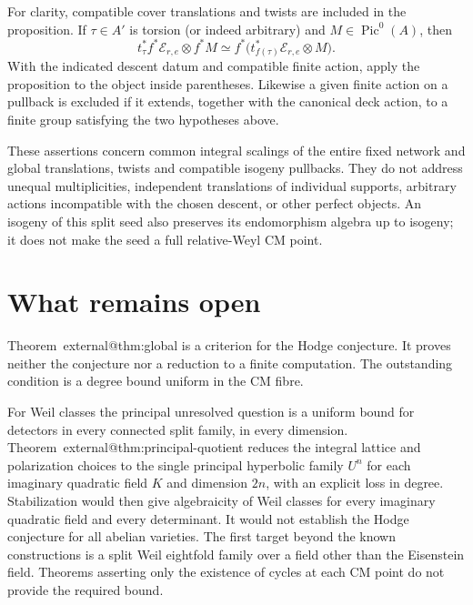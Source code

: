 \documentclass[11pt]{article}
\makeatletter
\providecommand{\compref}[1]{\csname external@#1\endcsname}
\theoremstyle{definition}
\theoremstyle{remark}
\makeatother
\begin{document}
For clarity, compatible cover translations and twists are
included in the proposition.  If $\tau\in A'$ is torsion
(or indeed arbitrary) and $M\in\operatorname{Pic}^0(A)$, then
\[
 t_\tau^*f^*\mathcal E_{r,e}\otimes f^*M
   \simeq f^*\bigl(t_{f(\tau)}^*\mathcal E_{r,e}\otimes M\bigr).
\]
With the indicated descent datum and compatible finite action,
apply the proposition to the object inside parentheses.
Likewise a given finite action on a pullback is excluded if it
extends, together with the canonical deck action, to a finite
group satisfying the two hypotheses above.

These assertions concern common integral scalings of the entire
fixed network and global translations, twists and compatible
isogeny pullbacks.  They do not address unequal multiplicities,
independent translations of individual supports, arbitrary
actions incompatible with the chosen descent, or other perfect
objects.  An isogeny of this split seed also preserves its
endomorphism algebra up to isogeny; it does not make the seed a
full relative-Weyl CM point.


\section{What remains open}
\label{sec:open}
Theorem~\compref{thm:global} is a criterion for the Hodge conjecture. It proves neither the conjecture nor a reduction to a finite computation. The outstanding condition is a degree bound uniform in the CM fibre.

For Weil classes the principal unresolved question is a uniform bound for detectors in every connected split family, in every dimension. Theorem~\compref{thm:principal-quotient} reduces the integral lattice and polarization choices to the single principal hyperbolic family $U^n$ for each imaginary quadratic field $K$ and dimension $2n$, with an explicit loss in degree. Stabilization would then give algebraicity of Weil classes for every imaginary quadratic field and every determinant. It would not establish the Hodge conjecture for all abelian varieties. The first target beyond the known constructions is a split Weil eightfold family over a field other than the Eisenstein field. Theorems asserting only the existence of cycles at each CM point do not provide the required bound.
\end{document}
